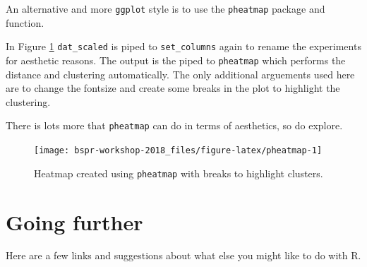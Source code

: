 \documentclass[12pt,]{book}
\newenvironment{Shaded}{\begin{snugshade}}{\end{snugshade}}
\newcommand{\KeywordTok}[1]{\textcolor[rgb]{0.13,0.29,0.53}{\textbf{#1}}}
\newcommand{\DataTypeTok}[1]{\textcolor[rgb]{0.13,0.29,0.53}{#1}}
\newcommand{\DecValTok}[1]{\textcolor[rgb]{0.00,0.00,0.81}{#1}}
\newcommand{\StringTok}[1]{\textcolor[rgb]{0.31,0.60,0.02}{#1}}
\newcommand{\CommentTok}[1]{\textcolor[rgb]{0.56,0.35,0.01}{\textit{#1}}}
\newcommand{\OperatorTok}[1]{\textcolor[rgb]{0.81,0.36,0.00}{\textbf{#1}}}
\newcommand{\NormalTok}[1]{#1}
\theoremstyle{definition}
\theoremstyle{definition}
\theoremstyle{definition}
\theoremstyle{remark}
\begin{document}
An alternative and more \texttt{ggplot} style is to use the
\texttt{pheatmap} package and function.

In Figure \ref{fig:pheatmap} \texttt{dat\_scaled} is piped to
\texttt{set\_columns} again to rename the experiments for aesthetic
reasons. The output is the piped to \texttt{pheatmap} which performs the
distance and clustering automatically. The only additional arguements
used here are to change the fontsize and create some breaks in the plot
to highlight the clustering.

There is lots more that \texttt{pheatmap} can do in terms of aesthetics,
so do explore.




\begin{Shaded}
\end{Shaded}

\begin{figure}

{\centering \texttt{[image: bspr-workshop-2018\_files/figure-latex/pheatmap-1]} 

}

\caption{Heatmap created using \texttt{pheatmap} with breaks to
highlight clusters.}\label{fig:pheatmap}
\end{figure}

\chapter{Going further}\label{going-further}

Here are a few links and suggestions about what else you might like to
do with R.
\end{document}

